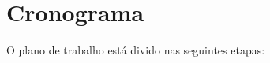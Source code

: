\documentclass[a4paper,11pt,titlepage,singlespacing]{article}
\begin{document}
    
    


\section{Cronograma}
\label{sec:cronograma}

O plano de trabalho está divido nas seguintes etapas:
\end{document}
